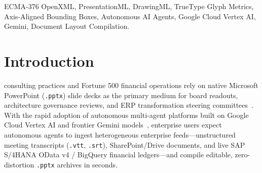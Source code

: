 \documentclass[10pt,journal,compsoc]{IEEEtran}
\begin{document}
{\begin{abstract}
$f_{\text{start}}$ via copy-paste-safe soft breaks, executes a $0.5\text{ pt}$ (\texttt{sz="50"} centi-point) step-down search, and synchronizes homogeneous sibling row font sizes ($f^*_{\text{row}} = \min_{j \in G_{\text{row}}} f^*_j$) with post-sync height re-verification under \texttt{<a:noAutofit/>} and \texttt{<a:spcPct val="115000"/>}; and (3) a \emph{Single-Axis EMU Aspect-Ratio Pinning Engine} for \texttt{@4x} Retina ($\ge 569.2\text{ DPI}$) assets. Across 120 adversarial decks (740 slides, 19,830 OpenXML shapes), 100 public benchmark slides (PPTC/SlidesBench), headless LibreOffice 300 DPI pixel audits, and live Vertex AI Gemini evaluations, Agent-SlideLock reduces layout and DLP violations to \textbf{0} ($100.0\%$ pass rate) in $14.2 \pm 1.8\text{ ms}$ of solver CPU time per deck.
\end{abstract}

\begin{IEEEkeywords}
ECMA-376 OpenXML, PresentationML, DrawingML, TrueType Glyph Metrics, Axis-Aligned Bounding Boxes, Autonomous AI Agents, Google Cloud Vertex AI, Gemini, Document Layout Compilation.
\end{IEEEkeywords}}

\maketitle
\IEEEdisplaynontitleabstractindextext
\IEEEpeerreviewmaketitle

\section{Introduction}
 consulting practices and Fortune 500 financial operations rely on native Microsoft PowerPoint (\texttt{.pptx}) slide decks as the primary medium for board readouts, architecture governance reviews, and ERP transformation steering committees~\cite{ecma376,iso29500}. With the rapid adoption of autonomous multi-agent platforms built on Google Cloud Vertex AI and frontier Gemini models~\cite{gemini2025,zheng2025pptagent,ge2025autopresent}, enterprise users expect autonomous agents to ingest heterogeneous enterprise feeds---unstructured meeting transcripts (\texttt{.vtt}, \texttt{.srt}), SharePoint/Drive documents, and live SAP S/4HANA OData v4 / BigQuery financial ledgers---and compile editable, zero-distortion \texttt{.pptx} archives in seconds.
\end{document}
